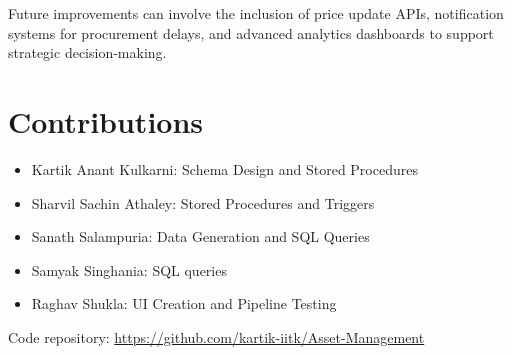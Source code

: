 \documentclass[11pt]{article}
\begin{document}
Future improvements can involve the inclusion of price update APIs, notification systems for procurement delays, and advanced analytics dashboards to support strategic decision-making.

\section{Contributions}
\begin{itemize}
  \item Kartik Anant Kulkarni: Schema Design and Stored Procedures
  \item Sharvil Sachin Athaley: Stored Procedures and Triggers
  \item Sanath Salampuria: Data Generation and SQL Queries
  \item Samyak Singhania: SQL queries
  \item Raghav Shukla: UI Creation and Pipeline Testing
\end{itemize}

Code repository: \url{https://github.com/kartik-iitk/Asset-Management}
\end{document}

